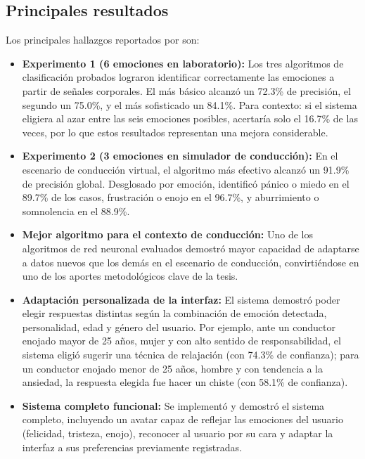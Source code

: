 \subsection{Principales resultados}

Los principales hallazgos reportados por \cite{nasoz2004} son:

\begin{itemize}
    \item \textbf{Experimento 1 (6 emociones en laboratorio):} Los tres algoritmos de clasificación probados lograron identificar correctamente las emociones a partir de señales corporales. El más básico alcanzó un 72.3\% de precisión, el segundo un 75.0\%, y el más sofisticado un 84.1\%. Para contexto: si el sistema eligiera al azar entre las seis emociones posibles, acertaría solo el 16.7\% de las veces, por lo que estos resultados representan una mejora considerable.

    \item \textbf{Experimento 2 (3 emociones en simulador de conducción):} En el escenario de conducción virtual, el algoritmo más efectivo alcanzó un 91.9\% de precisión global. Desglosado por emoción, identificó pánico o miedo en el 89.7\% de los casos, frustración o enojo en el 96.7\%, y aburrimiento o somnolencia en el 88.9\%.

    \item \textbf{Mejor algoritmo para el contexto de conducción:} Uno de los algoritmos de red neuronal evaluados demostró mayor capacidad de adaptarse a datos nuevos que los demás en el escenario de conducción, convirtiéndose en uno de los aportes metodológicos clave de la tesis.

    \item \textbf{Adaptación personalizada de la interfaz:} El sistema demostró poder elegir respuestas distintas según la combinación de emoción detectada, personalidad, edad y género del usuario. Por ejemplo, ante un conductor enojado mayor de 25 años, mujer y con alto sentido de responsabilidad, el sistema eligió sugerir una técnica de relajación (con 74.3\% de confianza); para un conductor enojado menor de 25 años, hombre y con tendencia a la ansiedad, la respuesta elegida fue hacer un chiste (con 58.1\% de confianza).

    \item \textbf{Sistema completo funcional:} Se implementó y demostró el sistema completo, incluyendo un avatar capaz de reflejar las emociones del usuario (felicidad, tristeza, enojo), reconocer al usuario por su cara y adaptar la interfaz a sus preferencias previamente registradas.
\end{itemize}

